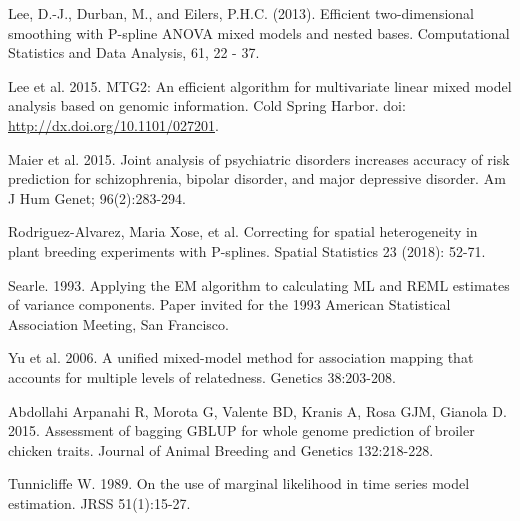 \documentclass[]{article}
\begin{document}
Lee, D.-J., Durban, M., and Eilers, P.H.C. (2013). Efficient
two-dimensional smoothing with P-spline ANOVA mixed models and nested
bases. Computational Statistics and Data Analysis, 61, 22 - 37.

Lee et al. 2015. MTG2: An efficient algorithm for multivariate linear
mixed model analysis based on genomic information. Cold Spring Harbor.
doi: \url{http://dx.doi.org/10.1101/027201}.

Maier et al. 2015. Joint analysis of psychiatric disorders increases
accuracy of risk prediction for schizophrenia, bipolar disorder, and
major depressive disorder. Am J Hum Genet; 96(2):283-294.

Rodriguez-Alvarez, Maria Xose, et al. Correcting for spatial
heterogeneity in plant breeding experiments with P-splines. Spatial
Statistics 23 (2018): 52-71.

Searle. 1993. Applying the EM algorithm to calculating ML and REML
estimates of variance components. Paper invited for the 1993 American
Statistical Association Meeting, San Francisco.

Yu et al. 2006. A unified mixed-model method for association mapping
that accounts for multiple levels of relatedness. Genetics 38:203-208.

Abdollahi Arpanahi R, Morota G, Valente BD, Kranis A, Rosa GJM, Gianola
D. 2015. Assessment of bagging GBLUP for whole genome prediction of
broiler chicken traits. Journal of Animal Breeding and Genetics
132:218-228.

Tunnicliffe W. 1989. On the use of marginal likelihood in time series
model estimation. JRSS 51(1):15-27.
\end{document}
